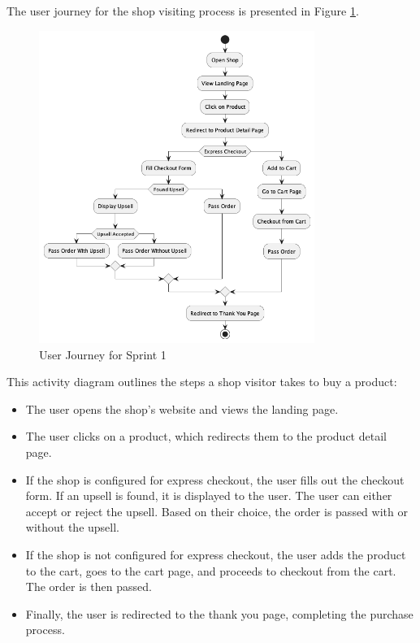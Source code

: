 The user journey for the shop visiting process is presented in Figure \ref{fig:user_journey_sprint1}.

\begin{figure}[H]
    \centering
    \includegraphics[width=0.8\textwidth]{images/sprintOneActivity.png}
    \caption{User Journey for Sprint 1}
    \label{fig:user_journey_sprint1}
\end{figure}

This activity diagram outlines the steps a shop visitor takes to buy a product:

\begin{itemize}
    \item The user opens the shop's website and views the landing page.
    \item The user clicks on a product, which redirects them to the product detail page.
    \item If the shop is configured for express checkout, the user fills out the checkout form. If an upsell is found, it is displayed to the user. The user can either accept or reject the upsell. Based on their choice, the order is passed with or without the upsell.
    \item If the shop is not configured for express checkout, the user adds the product to the cart, goes to the cart page, and proceeds to checkout from the cart. The order is then passed.
    \item Finally, the user is redirected to the thank you page, completing the purchase process.
\end{itemize}

